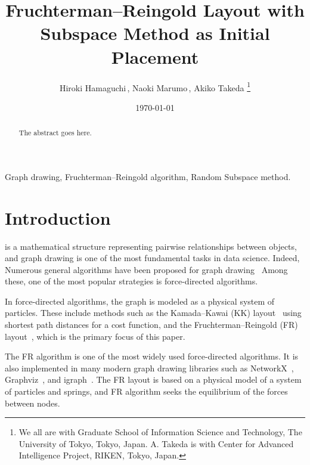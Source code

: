 \documentclass[dvipdfmx,journal]{IEEEtran}
\begin{document}

\title{Fruchterman--Reingold Layout with\\Subspace Method as Initial Placement}
\author{
  Hiroki Hamaguchi\,,
  Naoki Marumo\,,
  Akiko Takeda
  \thanks{
    We all are with Graduate School of Information Science and Technology, The University of Tokyo, Tokyo, Japan. A. Takeda is with Center for Advanced Intelligence Project, RIKEN, Tokyo, Japan.
  }
}
\date{\today}
\maketitle

\begin{abstract}
  The abstract goes here.
  \lipsum[1]
\end{abstract}

\begin{IEEEkeywords}
  Graph drawing, Fruchterman--Reingold algorithm, Random Subspace method.
\end{IEEEkeywords}

\section{Introduction}\label{sec:introduction}

 is a mathematical structure representing pairwise relationships between objects, and graph drawing is one of the most fundamental tasks in data science. Indeed, Numerous general algorithms have been proposed for graph drawing~\cite{tutteHowDrawGraph1963,chrobakLineartimeAlgorithmDrawing1995,sugiyamaMethodsVisualUnderstanding1981,ghassemitoosiSimulatedAnnealingPreProcessing2016}
Among these, one of the most popular strategies is force-directed algorithms.

In force-directed algorithms, the graph is modeled as a physical system of particles. These include methods such as the Kamada--Kawai (KK) layout~\cite{kamadaAlgorithmDrawingGeneral1989} using shortest path distances for a cost function, and the Fruchterman--Reingold (FR) layout~\cite{fruchtermanGraphDrawingForcedirected1991,kobourovSpringEmbeddersForce2012}, which is the primary focus of this paper.

The FR algorithm is one of the most widely used force-directed algorithms. It is also implemented in many modern graph drawing libraries such as NetworkX~\cite{osti_960616}, Graphviz~\cite{ellsonGraphvizOpenSource2002}, and igraph~\cite{csardiIgraphSoftwarePackage2006}. The FR layout is based on a physical model of a system of particles and springs, and FR algorithm seeks the equilibrium of the forces between nodes.
\end{document}

